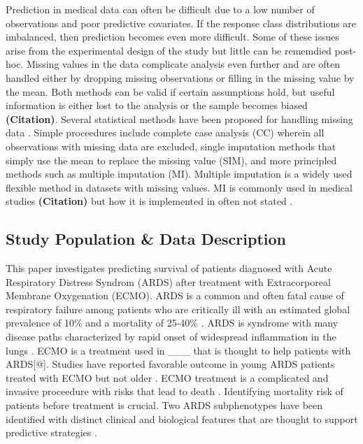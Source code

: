 \documentclass[12pt,]{article}
\begin{document}
Prediction in medical data can often be difficult due to a low number of
observations and poor predictive covariates. If the response class
distributions are imbalanced, then prediction becomes even more
difficult. Some of these issues arise from the experimental design of
the study but little can be rememdied post-hoc. Missing values in the
data complicate analysis even further and are often handled either by
dropping missing observations or filling in the missing value by the
mean. Both methods can be valid if certain assumptions hold, but useful
information is either lost to the analysis or the sample becomes biased
\textbf{(Citation)}. Several statistical methods have been proposed for
handling missing data \autocite{schafer_missing_2002}. Simple
proceedures include complete case analysis (CC) wherein all observations
with missing data are excluded, single imputation methods that simply
use the mean to replace the missing value (SIM), and more principled
methods such as multiple imputation (MI). Multiple imputation is a
widely used flexible method in datasets with missing values. MI is
commonly used in medical studies \textbf{(Citation)} but how it is
implemented in often not stated \autocite{mackinnon_use_2010}
\autocite{hayati_rezvan_rise_2015}.

\subsection{Study Population \& Data
Description}\label{study-population-data-description}

This paper investigates predicting survival of patients diagnosed with
Acute Respiratory Distress Syndrom (ARDS) after treatment with
Extracorporeal Membrane Oxygenation (ECMO). ARDS is a common and often
fatal cause of respiratory failure among patients who are critically ill
with an estimated global prevalence of 10\% and a mortality of 25-40\%
\autocite{bellani_epidemiology_2016}\autocite{rubenfeld_epidemiology_2007}\autocite{fan_acute_2018}.
ARDS is syndrome with many disease paths characterized by rapid onset of
widespread inflammation in the lungs \autocite{fan_acute_2018}. ECMO is
a treatment used in \_\_\_ that is thought to help patients with
ARDS{[}@{]}. Studies have reported favorable outcome in young ARDS
patients treated with ECMO but not older \autocite{Sahetya01052018}.
ECMO treatment is a complicated and invasive proceedure with risks that
lead to death \autocite{paolone_extracorporeal_2017}. Identifying
mortality risk of patients before treatment is crucial. Two ARDS
subphenotypes have been identified with distinct clinical and biological
features that are thought to support predictive strategies
\autocite{calfee_acute_2018}\autocite{sinha_latent_2018}.
\end{document}
